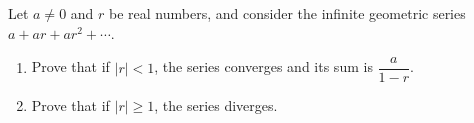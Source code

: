 Let $a\ne0$ and $r$ be real numbers, and consider the infinite geometric series $a+ar+ar^2+\cdots$.
\begin{enumerate}
\item[(a)] Prove that if $|r|<1$, the series converges and its sum is $\dfrac{a}{1-r}$.
\item[(b)] Prove that if $|r|\ge1$, the series diverges.
\end{enumerate}
